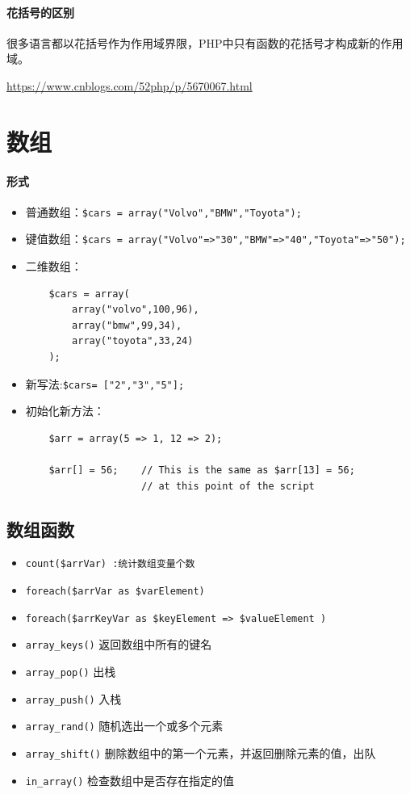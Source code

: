 \documentclass[UTF8,a4paper,12pt]{ctexbook}
\begin{document}
		\paragraph{花括号的区别}
			很多语言都以花括号作为作用域界限，PHP中只有函数的花括号才构成新的作用域。
			
			\url{https://www.cnblogs.com/52php/p/5670067.html}	
	\section{数组}
		\paragraph{形式}
			\begin{itemize}
				\item 普通数组：\verb|$cars = array("Volvo","BMW","Toyota");|
				\item 键值数组：\verb|$cars = array("Volvo"=>"30","BMW"=>"40","Toyota"=>"50");|
				\item 二维数组：
					\begin{lstlisting}
	$cars = array(
		array("volvo",100,96),
		array("bmw",99,34),
		array("toyota",33,24)
	);
					\end{lstlisting}
				\item 新写法:\verb|$cars= ["2","3","5"];|
				\item 初始化新方法：
					\begin{lstlisting}
	$arr = array(5 => 1, 12 => 2);
	
	$arr[] = 56;    // This is the same as $arr[13] = 56;
	                // at this point of the script
					\end{lstlisting}
			\end{itemize}
			
		
		\subsection{数组函数}
			\begin{itemize}
				\item \verb|count($arrVar) :统计数组变量个数|
				\item \verb|foreach($arrVar as $varElement)|
				\item \verb|foreach($arrKeyVar as $keyElement => $valueElement )|
				\item \verb|array_keys()| 返回数组中所有的键名
				\item \verb|array_pop()| 出栈
				\item \verb|array_push()| 入栈
				\item \verb|array_rand()| 随机选出一个或多个元素
				\item \verb|array_shift()| 删除数组中的第一个元素，并返回删除元素的值，出队
				\item \verb|in_array()| 检查数组中是否存在指定的值
			\end{itemize}	
			
\end{document}
